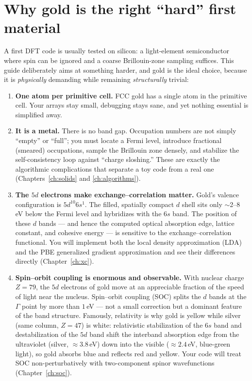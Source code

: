 \section{Why gold is the right ``hard'' first material}

A first DFT code is usually tested on silicon: a light-element semiconductor
where spin can be ignored and a coarse Brillouin-zone sampling suffices. This
guide deliberately aims at something harder, and gold is the ideal choice,
because it is
\emph{physically} demanding while remaining \emph{structurally} trivial:

\begin{enumerate}[leftmargin=2em]
\item \textbf{One atom per primitive cell.} FCC gold has a single atom in the
primitive cell. Your arrays stay small, debugging stays sane, and yet nothing
essential is simplified away.

\item \textbf{It is a metal.} There is no band gap. Occupation numbers are not
simply ``empty'' or ``full''; you must locate a Fermi level, introduce fractional
(smeared) occupations, sample the Brillouin zone densely, and stabilize the
self-consistency loop against ``charge sloshing.'' These are exactly the
algorithmic complications that separate a toy code from a real one
(Chapters~\ref{ch:solids} and \ref{ch:algorithms}).

\item \textbf{The $5d$ electrons make exchange--correlation matter.} Gold's
valence configuration is $5d^{10}6s^1$. The filled, spatially compact $d$
shell sits only $\sim$2--8\,eV below the Fermi level and hybridizes with the
$6s$ band. The position of these $d$ bands --- and hence the computed optical
absorption edge, lattice constant, and cohesive energy --- is sensitive to the
exchange--correlation functional. You will implement both the local density
approximation (LDA) and the PBE generalized gradient approximation and see
their differences directly (Chapter~\ref{ch:xc}).

\item \textbf{Spin--orbit coupling is enormous and observable.} With nuclear
charge $Z=79$, the $5d$ electrons of gold move at an appreciable fraction of
the speed of light near the nucleus. Spin--orbit coupling (SOC) splits the
$d$ bands at the $\Gamma$ point by more than $1$\,eV --- not a small correction
but a dominant feature of the band structure. Famously, relativity is why
gold is yellow while silver (same column, $Z=47$) is white: relativistic
stabilization of the $6s$ band and destabilization of the $5d$ band shift the
interband absorption edge from the ultraviolet (silver, $\approx 3.8$\,eV)
down into the visible ($\approx 2.4$\,eV, blue-green light), so gold absorbs
blue and reflects red and yellow. Your code
will treat SOC non-perturbatively with two-component spinor wavefunctions
(Chapter~\ref{ch:soc}).


\end{enumerate}
